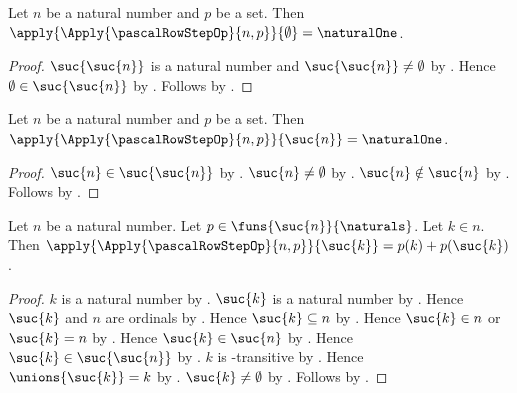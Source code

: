 \begin{lemma}\label{pascal_row_step_first}
    Let $n$ be a natural number and $p$ be a set.
    Then $\apply{\Apply{\pascalRowStepOp}{n,p}}{\emptyset}
        =\naturalOne$.
\end{lemma}
\begin{proof}
    $\suc{\suc{n}}$ is a natural number and
        $\suc{\suc{n}}\neq\emptyset$ by
        .
    Hence $\emptyset\in\suc{\suc{n}}$ by
        .
    Follows by
        .
\end{proof}

\begin{lemma}\label{pascal_row_step_last}
    Let $n$ be a natural number and $p$ be a set.
    Then $\apply{\Apply{\pascalRowStepOp}{n,p}}{\suc{n}}
        =\naturalOne$.
\end{lemma}
\begin{proof}
    $\suc{n}\in\suc{\suc{n}}$ by .
    $\suc{n}\neq\emptyset$ by .
    $\suc{n}\notin\suc{n}$ by .
    Follows by
        .
\end{proof}

\begin{lemma}\label{pascal_row_step_interior}
    Let $n$ be a natural number.
    Let $p\in\funs{\suc{n}}{\naturals}$.
    Let $k\in n$.
    Then
        $\apply{\Apply{\pascalRowStepOp}{n,p}}{\suc{k}}
            =p(k)+p(\suc{k})$.
\end{lemma}
\begin{proof}
    $k$ is a natural number by
        .
    $\suc{k}$ is a natural number by .
    Hence $\suc{k}$ and $n$ are ordinals by
        .
    Hence $\suc{k}\subseteq n$ by .
    Hence $\suc{k}\in n$ or $\suc{k}=n$ by
        .
    Hence $\suc{k}\in\suc{n}$ by .
    Hence $\suc{k}\in\suc{\suc{n}}$ by
        .
    $k$ is \in-transitive by
        .
    Hence $\unions{\suc{k}}=k$ by
        .
    $\suc{k}\neq\emptyset$ by .
    Follows by
        .
\end{proof}

